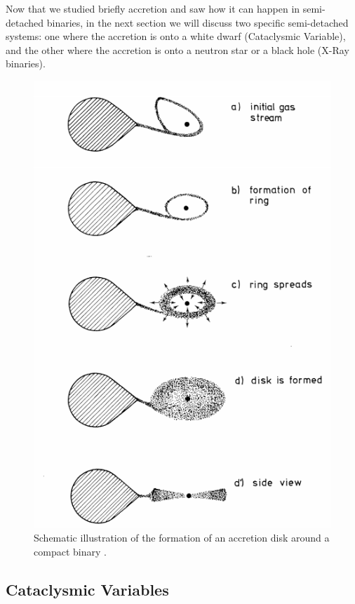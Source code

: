 Now that we studied briefly accretion and saw how it can happen in semi-detached binaries, in the next section we will discuss two specific semi-detached systems: one where the accretion is onto a white dwarf (Cataclysmic Variable), and the other where the accretion is onto a neutron star or a black hole (X-Ray binaries). 


\begin{figure}[]
        \centering
\includegraphics[scale=.3]{assets/images/accretiondisk.png}
\caption{Schematic illustration of the formation of an accretion disk around a compact binary \citep{verbunt_accretion_1982}.}
\label{fig:roche}
\end{figure}


\subsection{Cataclysmic Variables}

